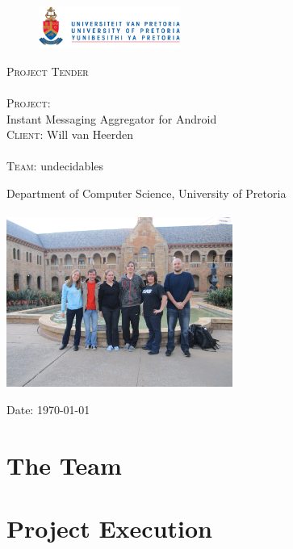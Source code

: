 \documentclass[12pt]{article}
\begin{document}
\begin{titlepage}
	\begin{center}
		
		\begin{figure}[t]
			\centering
			\includegraphics[width=175px]{UP_Logo.png}
		\end{figure}
		
		\textsc{\Huge Project Tender} \\ 

		\textsc{\huge \\Project:\\	}
		\huge Instant Messaging Aggregator for Android 
		\textsc{\Large \\Client:}
		\large Will van Heerden \\

		\textsc{\huge \\Team:}
		\huge \textsc{}undecidables\textsc{}
		
		\small Department of Computer Science, University of Pretoria \\
		\hfill \\
		\includegraphics[width=280px]{Team.JPG}\\

	\vfill

	{\large Date: \today}		
		
		
	\end{center}
\end{titlepage}

\pagebreak
\tableofcontents

\pagebreak
\section{The Team}


\pagebreak
\section{Project Execution}

\end{document}

